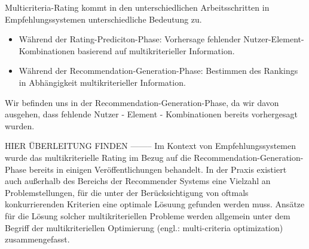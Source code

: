 Multicriteria-Rating kommt in den unterschiedlichen Arbeitsschritten in Empfehlungssystemen unterschiedliche Bedeutung zu. %
\begin{itemize}
    \item Während der Rating-Prediciton-Phase: Vorhersage fehlender Nutzer-Element-Kombinationen basierend auf multikriterieller Information.
    \item Während der Recommendation-Generation-Phase: Bestimmen des Rankings in Abhängigkeit multikriterieller Information.
\end{itemize}
Wir befinden uns in der Recommendation-Generation-Phase, da wir davon ausgehen, dass fehlende Nutzer - Element - Kombinationen bereits vorhergesagt wurden.

HIER ÜBERLEITUNG FINDEN --------
Im Kontext von Empfehlungssystemen wurde das multikriterielle Rating im Bezug auf die Recommendation-Generation-Phase bereits in einigen Veröffentlichungen behandelt. %
In der Praxis existiert auch außerhalb des Bereichs der Recommender Systems eine Vielzahl an Problemstellungen, für die unter der Berücksichtigung von oftmals konkurrierenden Kriterien eine optimale Lösuung gefunden werden muss. %
Ansätze für die Lösung solcher multikriteriellen Probleme werden allgemein unter dem Begriff der multikriteriellen Optimierung (engl.: multi-criteria optimization) zusammengefasst. %

